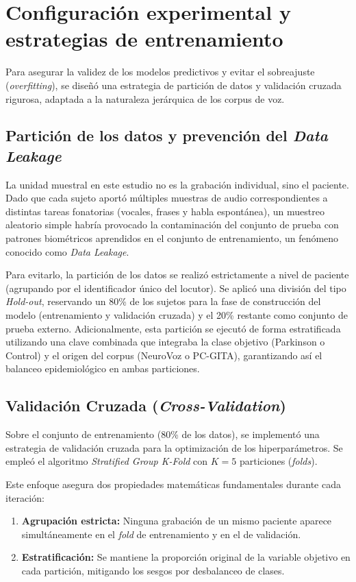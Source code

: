 \section{Configuración experimental y estrategias de entrenamiento}\label{sec:configuracion_experimental}

Para asegurar la validez de los modelos predictivos y evitar el sobreajuste (\textit{overfitting}), se diseñó una estrategia de partición de datos y validación cruzada rigurosa, adaptada a la naturaleza jerárquica de los corpus de voz.

\subsection{Partición de los datos y prevención del \textit{Data Leakage}}
La unidad muestral en este estudio no es la grabación individual, sino el paciente. Dado que cada sujeto aportó múltiples muestras de audio correspondientes a distintas tareas fonatorias (vocales, frases y habla espontánea), un muestreo aleatorio simple habría provocado la contaminación del conjunto de prueba con patrones biométricos aprendidos en el conjunto de entrenamiento, un fenómeno conocido como \textit{Data Leakage}.

Para evitarlo, la partición de los datos se realizó estrictamente a nivel de paciente (agrupando por el identificador único del locutor). Se aplicó una división del tipo \textit{Hold-out}, reservando un 80\% de los sujetos para la fase de construcción del modelo (entrenamiento y validación cruzada) y el 20\% restante como conjunto de prueba externo. Adicionalmente, esta partición se ejecutó de forma estratificada utilizando una clave combinada que integraba la clase objetivo (Parkinson o Control) y el origen del corpus (NeuroVoz o PC-GITA), garantizando así el balanceo epidemiológico en ambas particiones.

\subsection{Validación Cruzada (\textit{Cross-Validation})}
Sobre el conjunto de entrenamiento (80\% de los datos), se implementó una estrategia de validación cruzada para la optimización de los hiperparámetros. Se empleó el algoritmo \textit{Stratified Group K-Fold} con $K=5$ particiones (\textit{folds}). 

Este enfoque asegura dos propiedades matemáticas fundamentales durante cada iteración:
\begin{enumerate}
    \item \textbf{Agrupación estricta:} Ninguna grabación de un mismo paciente aparece simultáneamente en el \textit{fold} de entrenamiento y en el de validación.
    \item \textbf{Estratificación:} Se mantiene la proporción original de la variable objetivo en cada partición, mitigando los sesgos por desbalanceo de clases.
\end{enumerate}

